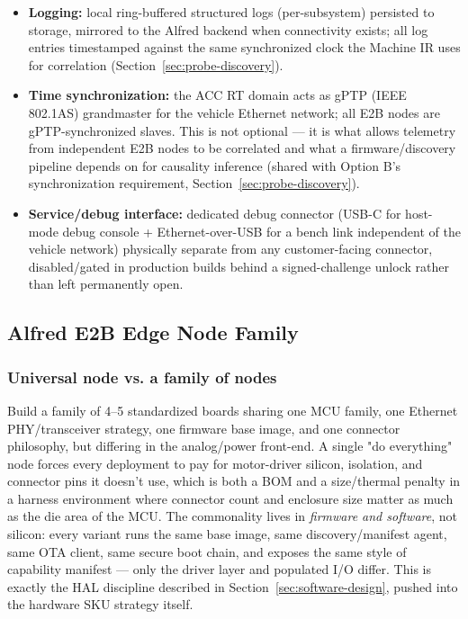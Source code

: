 \begin{itemize}
\item \textbf{Logging:} local ring-buffered structured logs (per-subsystem) persisted to storage, mirrored to the Alfred backend when connectivity exists; all log entries timestamped against the same synchronized clock the Machine IR uses for correlation (Section~\ref{sec:probe-discovery}).
\item \textbf{Time synchronization:} the ACC RT domain acts as gPTP (IEEE 802.1AS) grandmaster for the vehicle Ethernet network; all E2B nodes are gPTP-synchronized slaves. This is not optional --- it is what allows telemetry from independent E2B nodes to be correlated and what a firmware/discovery pipeline depends on for causality inference (shared with Option B's synchronization requirement, Section~\ref{sec:probe-discovery}).
\item \textbf{Service/debug interface:} dedicated debug connector (USB-C for host-mode debug console + Ethernet-over-USB for a bench link independent of the vehicle network) physically separate from any customer-facing connector, disabled/gated in production builds behind a signed-challenge unlock rather than left permanently open.
\end{itemize}

\subsection{Alfred E2B Edge Node Family}
\label{sec:e2b-family}

\subsubsection{Universal node vs. a family of nodes}

\begin{decision}[title={Recommendation: a small family, not one universal node}]
Build a family of 4--5 standardized boards sharing one MCU family, one Ethernet PHY/transceiver strategy, one firmware base image, and one connector philosophy, but differing in the analog/power front-end. A single "do everything" node forces every deployment to pay for motor-driver silicon, isolation, and connector pins it doesn't use, which is both a BOM and a size/thermal penalty in a harness environment where connector count and enclosure size matter as much as the die area of the MCU. The commonality lives in \emph{firmware and software}, not silicon: every variant runs the same base image, same discovery/manifest agent, same OTA client, same secure boot chain, and exposes the same style of capability manifest --- only the driver layer and populated I/O differ. This is exactly the HAL discipline described in Section~\ref{sec:software-design}, pushed into the hardware SKU strategy itself.
\end{decision}

